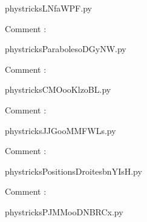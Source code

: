     \newcommand{\CaptionFigLNfaWPF}{<+Type your caption here+>}
    \begin{center}
        
    \end{center}
    phystricksLNfaWPF.py

    Comment : 

    \clearpage
    


    \newcommand{\CaptionFigParabolesoDGyNW}{<+Type your caption here+>}
    \begin{center}
        
    \end{center}
    phystricksParabolesoDGyNW.py

    Comment : 

    \clearpage
    


    \newcommand{\CaptionFigCMOooKlzoBL}{<+Type your caption here+>}
    \begin{center}
        
    \end{center}
    phystricksCMOooKlzoBL.py

    Comment : 

    \clearpage
    


    \newcommand{\CaptionFigJJGooMMFWLs}{<+Type your caption here+>}
    \begin{center}
        
    \end{center}
    phystricksJJGooMMFWLs.py

    Comment : 

    \clearpage
    


    \newcommand{\CaptionFigPositionsDroitesbnYIsH}{<+Type your caption here+>}
    \begin{center}
        
    \end{center}
    phystricksPositionsDroitesbnYIsH.py

    Comment : 

    \clearpage
    


    \newcommand{\CaptionFigPJMMooDNBRCx}{<+Type your caption here+>}
    \begin{center}
        
    \end{center}
    phystricksPJMMooDNBRCx.py

